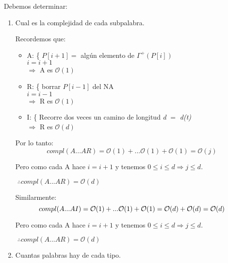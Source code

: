\documentclass[12pt,a4paper]{report}
\begin{document}
		Debemos determinar:
		\begin{enumerate}
			\item Cual es la complejidad de cada subpalabra.
				
				Recordemos que:
		\begin{itemize}
			\item A:  \{ $P[i+1] =$ algún elemento de $\Gamma^{+}(P[i])$ \\
						  $i = i+1$ \\
						$\Rightarrow$ A es $\mathcal{O}(1)$
						
			\item R: \{ borrar $P[i-1]$ del NA \\
						  $i = i-1$ \\
						$\Rightarrow$ R es $\mathcal{O}(1)$
						
			\item I: \{ Recorre dos veces un camino de longitud \textit{d} $=$ \textit{d(\textit{t})} \\
						$\Rightarrow$ R es $\mathcal{O}(\textit{d})$
		\end{itemize}
		
		Por lo tanto:
		\begin{equation}
			compl(A...AR) = \mathcal{O}(1) + ... \mathcal{O}(1) + \mathcal{O}(1)
									= \mathcal{O}(j)
		\end{equation}
		
		Pero como cada A hace $ i = i+1$ y tenemos $ 0 \leq \textit{i} \leq \textit{d} \Rightarrow \textit{j} \leq \textit{d}.$
		
		\begin{center}
			$ \; \therefore compl(A...AR) = \mathcal{O}(\textit{d})$
		\end{center}
		
		Similarmente: 		
		\begin{equation}
			compl(A...AI) = \mathcal{O}(1) + ... \mathcal{O}(1) + \mathcal{O}(1) \\
									= \mathcal{O}(d) + \mathcal{O}(d) \\
									= \mathcal{O}(d)
		\end{equation}
		
		Pero como cada A hace $ i = i+1$ y tenemos $ 0 \leq \textit{i} \leq \textit{d} \Rightarrow \textit{j} \leq \textit{d}.$
		
		\begin{center}
			$ \; \therefore compl(A...AR) = \mathcal{O}(\textit{d})$
		\end{center}			
			

			\item Cuantas palabras hay de cada tipo.
			
				
		\end{enumerate}
		
\end{document}
